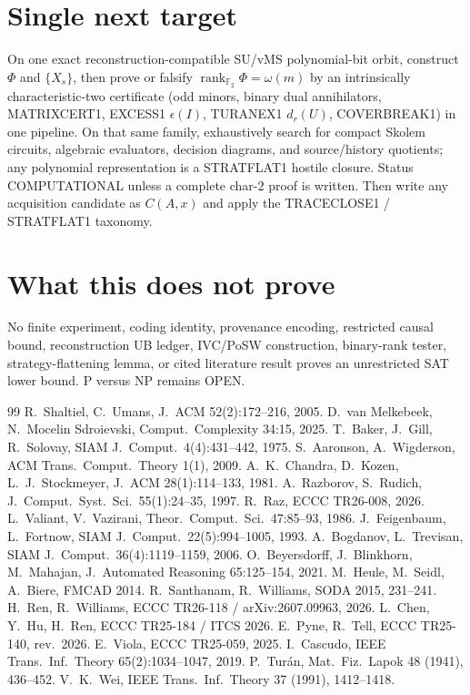 \documentclass[11pt]{article}
\begin{document}
\section*{Single next target}
On one exact reconstruction-compatible SU/vMS polynomial-bit orbit, construct $\Phi$ and
$\{X_s\}$, then prove or falsify $\operatorname{rank}_{\mathbb F_2}\Phi=\omega(m)$ by an
intrinsically characteristic-two certificate (odd minors, binary dual annihilators, MATRIXCERT1,
EXCESS1 $\epsilon(I)$, TURANEX1 $d_r(U)$, COVERBREAK1) in one pipeline. On that same family,
exhaustively search for compact Skolem circuits, algebraic evaluators, decision diagrams, and
source/history quotients; any polynomial representation is a STRATFLAT1 hostile closure.
Status COMPUTATIONAL unless a complete char-$2$ proof is written. Then write any acquisition
candidate as $C(A,x)$ and apply the TRACECLOSE1 / STRATFLAT1 taxonomy.

\section*{What this does not prove}
No finite experiment, coding identity, provenance encoding, restricted causal bound,
reconstruction UB ledger, IVC/PoSW construction, binary-rank tester, strategy-flattening lemma,
or cited literature result proves an unrestricted SAT lower bound. P versus NP remains OPEN.

\begin{thebibliography}{99}
 R.~Shaltiel, C.~Umans, J.~ACM 52(2):172--216, 2005.
 D.~van Melkebeek, N.~Mocelin Sdroievski, Comput.\ Complexity 34:15, 2025.
 T.~Baker, J.~Gill, R.~Solovay, SIAM J.\ Comput.\ 4(4):431--442, 1975.
 S.~Aaronson, A.~Wigderson, ACM Trans.\ Comput.\ Theory 1(1), 2009.
 A.~K.~Chandra, D.~Kozen, L.~J.~Stockmeyer, J.~ACM 28(1):114--133, 1981.
 A.~Razborov, S.~Rudich, J.\ Comput.\ Syst.\ Sci.\ 55(1):24--35, 1997.
 R.~Raz, ECCC TR26-008, 2026.
 L.~Valiant, V.~Vazirani, Theor.\ Comput.\ Sci.\ 47:85--93, 1986.
 J.~Feigenbaum, L.~Fortnow, SIAM J.\ Comput.\ 22(5):994--1005, 1993.
 A.~Bogdanov, L.~Trevisan, SIAM J.\ Comput.\ 36(4):1119--1159, 2006.
 O.~Beyersdorff, J.~Blinkhorn, M.~Mahajan, J.\ Automated Reasoning 65:125--154, 2021.
 M.~Heule, M.~Seidl, A.~Biere, FMCAD 2014.
 R.~Santhanam, R.~Williams, SODA 2015, 231--241.
 H.~Ren, R.~Williams, ECCC TR26-118 / arXiv:2607.09963, 2026.
 L.~Chen, Y.~Hu, H.~Ren, ECCC TR25-184 / ITCS 2026.
 E.~Pyne, R.~Tell, ECCC TR25-140, rev.\ 2026.
 E.~Viola, ECCC TR25-059, 2025.
 I.~Cascudo, IEEE Trans.\ Inf.\ Theory 65(2):1034--1047, 2019.
 P.~Tur\'an, Mat.\ Fiz.\ Lapok 48 (1941), 436--452.
 V.~K.~Wei, IEEE Trans.\ Inf.\ Theory 37 (1991), 1412--1418.
\end{thebibliography}

\end{document}
